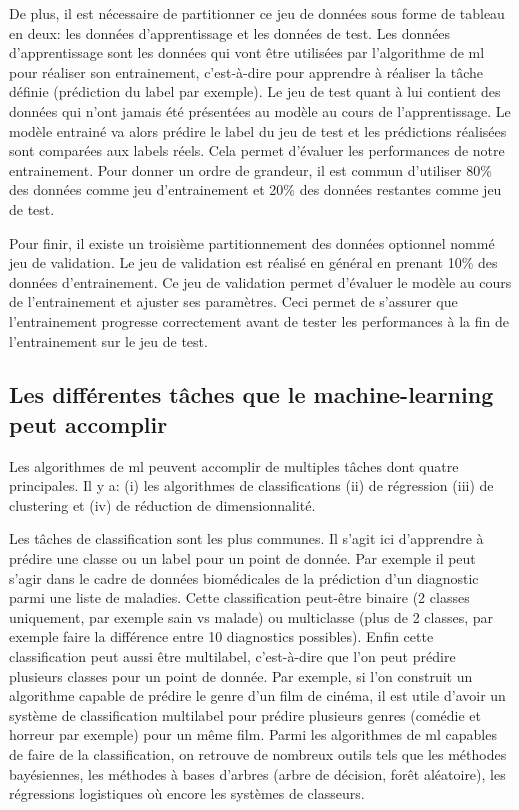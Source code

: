 De plus, il est nécessaire de partitionner ce jeu de données sous forme de tableau en deux: les données d'apprentissage et les données de test. Les données d'apprentissage sont les données qui vont être utilisées par l'algorithme de \gls{ml} pour réaliser son entrainement, c'est-à-dire pour apprendre à réaliser la tâche définie (prédiction du label par exemple). Le jeu de test quant à lui contient des données qui n'ont jamais été présentées au modèle au cours de l'apprentissage. Le modèle entrainé va alors prédire le label du jeu de test et les prédictions réalisées sont comparées aux labels réels. Cela permet d'évaluer les performances de notre entrainement. Pour donner un ordre de grandeur, il est commun d'utiliser 80\% des données comme jeu d'entrainement et 20\% des données restantes comme jeu de test.

Pour finir, il existe un troisième partitionnement des données optionnel nommé jeu de validation. Le jeu de validation est réalisé en général en prenant 10\% des données d'entrainement. Ce jeu de validation permet d'évaluer le modèle au cours de l'entrainement et  ajuster ses paramètres. Ceci permet de s'assurer que l'entrainement progresse correctement avant de tester les performances à la fin de l'entrainement sur le jeu de test.

\subsection{Les différentes tâches que le machine-learning peut accomplir}
Les algorithmes de \gls{ml} peuvent accomplir de multiples tâches dont quatre principales. Il y a: (i) les algorithmes de classifications (ii) de régression (iii) de clustering et (iv) de réduction de dimensionnalité.

Les tâches de classification sont les plus communes. Il s'agit ici d'apprendre à prédire une classe ou un label pour un point de donnée. Par exemple il peut s'agir dans le cadre de données biomédicales de la prédiction d'un diagnostic parmi une liste de maladies. Cette classification peut-être binaire (2 classes uniquement, par exemple sain vs malade) ou multiclasse (plus de 2 classes, par exemple faire la différence entre 10 diagnostics possibles). Enfin cette classification peut aussi être multilabel, c'est-à-dire que l'on peut prédire plusieurs classes pour un point de donnée. Par exemple, si l’on construit un algorithme capable de prédire le genre d'un film de cinéma, il est utile d'avoir un système de classification multilabel pour prédire plusieurs genres (comédie et horreur par exemple) pour un même film. Parmi les algorithmes de \gls{ml} capables de faire de la classification, on retrouve de nombreux outils tels que les méthodes bayésiennes, les méthodes à bases d'arbres (arbre de décision, forêt aléatoire), les régressions logistiques où encore les systèmes de classeurs.

